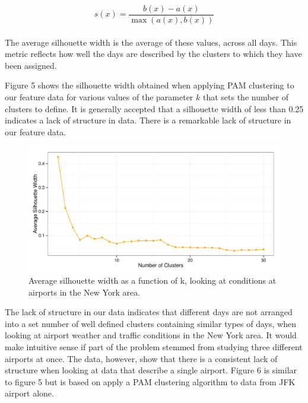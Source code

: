 \documentclass[11pt]{scrartcl}
\begin{document}
$$s(x) = \frac{b(x)-a(x)}{\max (a(x),b(x))}$$\\

The average silhouette width is the average of these values, across all days.  This metric reflects how well the days are described by the clusters to which they have been assigned.

Figure 5 shows the silhouette width obtained when applying PAM clustering to our feature data for various values of the parameter $k$ that sets the number of clusters to define.  It is generally accepted that a silhouette width of less than 0.25 indicates a lack of structure in data.  There is a remarkable lack of structure in our feature data.

\begin{figure}[h]
\begin{center}
\includegraphics[scale=0.8125]{./figures/Fig5.pdf}
\caption{Average silhouette width as a function of k, looking at conditions at airports in the New York area.}
\label{default}
\end{center}
\end{figure}

The lack of structure in our data indicates that different days are not arranged into a set number of well defined clusters containing similar types of days, when looking at airport weather and traffic conditions in the New York area.  It would make intuitive sense if part of the problem stemmed from studying three different airports at once.  The data, however, show that there is a consistent lack of structure when looking at data that describe a single airport.  Figure 6 is similar to figure 5 but is based on apply a PAM clustering algorithm to data from JFK airport alone.
\end{document}
